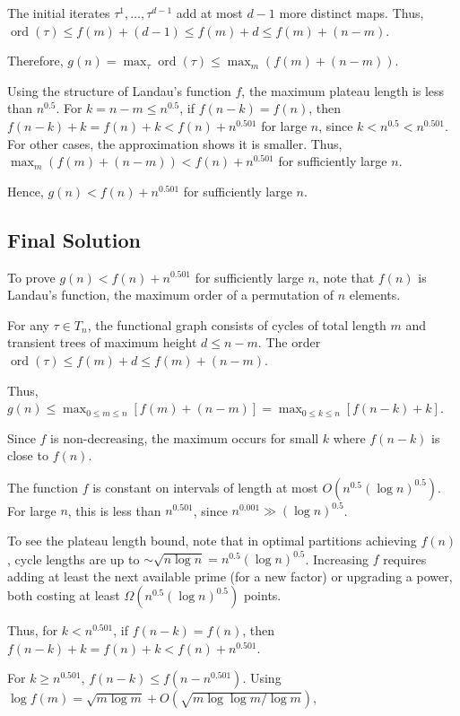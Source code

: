 \documentclass[12pt,a4paper]{article}
\theoremstyle{definition}
\begin{document}
    The initial iterates $\tau^1, \dots, \tau^{d-1}$ add at most $d-1$ more distinct maps. Thus, $\operatorname{ord}(\tau) \leq f(m) + (d-1) \leq f(m) + d \leq f(m) + (n-m)$.

    Therefore, $g(n) = \max_\tau \operatorname{ord}(\tau) \leq \max_m (f(m) + (n-m))$.

    Using the structure of Landau's function $f$, the maximum plateau length is less than $n^{0.5}$. For $k = n-m \leq n^{0.5}$, if $f(n-k) = f(n)$, then $f(n-k) + k = f(n) + k < f(n) + n^{0.501}$ for large $n$, since $k < n^{0.5} < n^{0.501}$. For other cases, the approximation shows it is smaller. Thus, $\max_m (f(m) + (n-m)) < f(n) + n^{0.501}$ for sufficiently large $n$.

    Hence, $g(n) < f(n) + n^{0.501}$ for sufficiently large $n$.

\subsection{Final Solution}
    To prove $g(n) < f(n) + n^{0.501}$ for sufficiently large $n$, note that $f(n)$ is Landau's function, the maximum order of a permutation of $n$ elements.

    For any $\tau \in T_n$, the functional graph consists of cycles of total length $m$ and transient trees of maximum height $d \leq n - m$. The order $\operatorname{ord}(\tau) \leq f(m) + d \leq f(m) + (n - m)$.

    Thus, $g(n) \leq \max_{0 \leq m \leq n} [f(m) + (n - m)] = \max_{0 \leq k \leq n} [f(n - k) + k]$.

    Since $f$ is non-decreasing, the maximum occurs for small $k$ where $f(n - k)$ is close to $f(n)$.

    The function $f$ is constant on intervals of length at most $O(n^{0.5} (\log n)^{0.5})$. For large $n$, this is less than $n^{0.501}$, since $n^{0.001} \gg (\log n)^{0.5}$.

    To see the plateau length bound, note that in optimal partitions achieving $f(n)$, cycle lengths are up to $\sim \sqrt{n \log n} = n^{0.5} (\log n)^{0.5}$. Increasing $f$ requires adding at least the next available prime (for a new factor) or upgrading a power, both costing at least $\Omega(n^{0.5} (\log n)^{0.5})$ points.

    Thus, for $k < n^{0.501}$, if $f(n - k) = f(n)$, then $f(n - k) + k = f(n) + k < f(n) + n^{0.501}$.

    For $k \geq n^{0.501}$, $f(n - k) \leq f(n - n^{0.501})$. Using $\log f(m) = \sqrt{m \log m} + O(\sqrt{m \log \log m / \log m})$,
\end{document}
